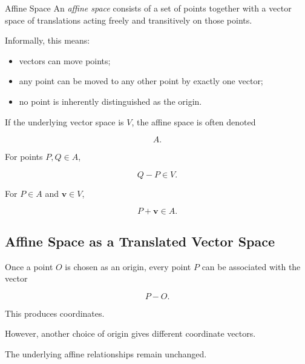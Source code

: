 \begin{definitionbox}{Affine Space}
An \emph{affine space} consists of a set of points together with a vector
space of translations acting freely and transitively on those points.
\end{definitionbox}

Informally, this means:

\begin{itemize}
    \item vectors can move points;
    \item any point can be moved to any other point by exactly one vector;
    \item no point is inherently distinguished as the origin.
\end{itemize}

If the underlying vector space is \(V\), the affine space is often denoted

\[ A. \]

For points \(P,Q\in A\),

\[ Q-P\in V. \]

For \(P\in A\) and \(\mathbf{v}\in V\),

\[ P+\mathbf{v}\in A. \]

\subsection{Affine Space as a Translated Vector Space}
\label{subsec:translated-vector-space}

Once a point \(O\) is chosen as an origin, every point \(P\) can be associated
with the vector

\[ P-O. \]

This produces coordinates.

However, another choice of origin gives different coordinate vectors.

The underlying affine relationships remain unchanged.

\begin{centereddiagram}
\end{centereddiagram}

